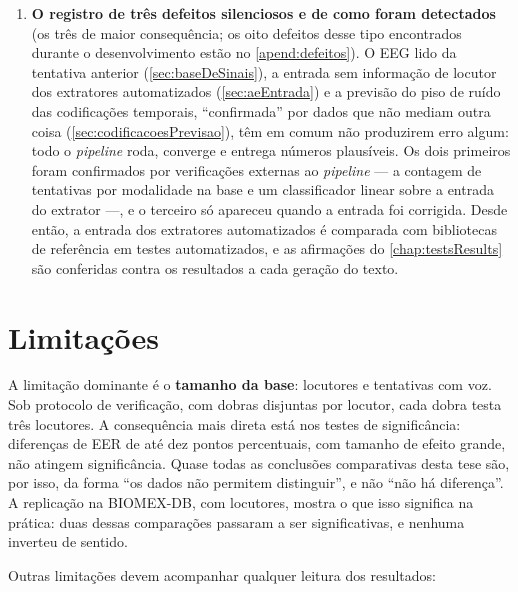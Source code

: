 \begin{enumerate}
			\item \textbf{O registro de três defeitos silenciosos e de como foram
			detectados} (os três de maior consequência; os oito defeitos desse tipo encontrados durante o
			desenvolvimento estão no \autoref{apend:defeitos}). O \ac{EEG} lido da tentativa anterior
			(\autoref{sec:baseDeSinais}), a entrada sem informação de locutor dos
			extratores automatizados (\autoref{sec:aeEntrada}) e a
			previsão do piso de ruído das codificações temporais, ``confirmada''
			por dados que não mediam outra coisa (\autoref{sec:codificacoesPrevisao}),
			têm em comum não produzirem erro algum: todo o \textit{pipeline} roda,
			converge e entrega números plausíveis. Os dois primeiros foram
			confirmados por verificações externas ao \textit{pipeline} --- a
			contagem de tentativas por modalidade na base e um classificador linear
			sobre a entrada do extrator ---, e o terceiro só apareceu quando a
			entrada foi corrigida. Desde então, a entrada dos extratores
			automatizados é comparada com bibliotecas de referência em testes
			automatizados, e as afirmações do \autoref{chap:testsResults} são
			conferidas contra os resultados a cada geração do texto.
		\end{enumerate}

	\section{Limitações}

		\par A limitação dominante é o \textbf{tamanho da base}:  locutores e
		 tentativas com voz. Sob protocolo de verificação, com
		dobras disjuntas por locutor, cada dobra testa três locutores. A
		consequência mais direta está nos testes de significância: diferenças de
		\ac{EER} de até dez pontos percentuais, com tamanho de efeito grande,
		não atingem significância. Quase todas as conclusões comparativas desta
		tese são, por isso, da forma ``os dados não permitem distinguir'', e não
		``não há diferença''. A replicação na BIOMEX-DB, com
		 locutores, mostra o que isso significa na prática:
		duas dessas comparações passaram a ser significativas, e nenhuma
		inverteu de sentido.

		\par Outras limitações devem acompanhar qualquer leitura dos resultados:

